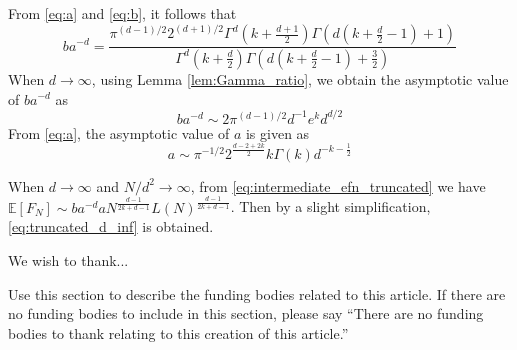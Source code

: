 \documentclass{aptpub}
\def\E{\mathbb{E}}
\begin{document}
From \eqref{eq:a} and \eqref{eq:b}, it follows that
\begin{equation}
     ba^{-d}
     = \frac{\pi^{(d-1)/2} 2^{(d+1)/2}
     \Gamma^d(k+\frac{d+1}{2})
     \Gamma(d(k+\frac{d}{2}-1)+1)}{\Gamma^d(k+\frac{d}{2})\Gamma(d(k+\frac{d}{2}-1)+ \frac{3}{2})}
 \end{equation}
 When $d\to \infty$, using Lemma \ref{lem:Gamma_ratio},
 we obtain the asymptotic value of $ba^{-d}$ as
 \begin{equation}
     ba^{-d} \sim 2\pi^{(d-1)/2}
     d^{-1}e^kd^{d/2}
 \end{equation}
 From \eqref{eq:a}, the asymptotic value of $a$ is given as
 \begin{equation}
     a \sim \pi^{-1/2} 2^{\frac{d-2+2k}{2}} k \Gamma(k) d^{-k-\frac{1}{2}}
 \end{equation}

When $d\to \infty$ and $N/d^2\to \infty$,
from \eqref{eq:intermediate_efn_truncated}
we have $\E[F_N] \sim ba^{-d} a N^{\frac{d-1}{2k+d-1}}
L(N)
^{\frac{d-1}{2k+d-1}}$.
Then by a slight simplification,
\eqref{eq:truncated_d_inf} is obtained.
 



\acks %
\noindent We wish to thank...



\fund %
\noindent Use this section to describe the funding bodies related to this article. If there are no funding bodies to include in this section, please say ``There are no funding bodies to thank relating to this creation of this article.''
\end{document}
